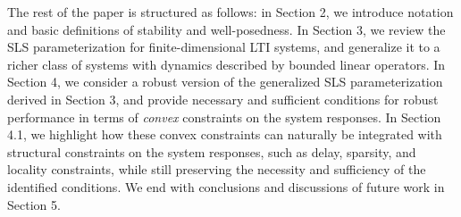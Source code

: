 The rest of the paper is structured as follows: in Section 2, we introduce notation and basic definitions of stability and well-posedness.  In Section 3, we review the SLS parameterization for finite-dimensional LTI systems, and generalize it to a richer class of systems with dynamics described by bounded linear operators.  In Section 4, we consider a robust version of the generalized SLS parameterization derived in Section 3, and provide necessary and sufficient conditions for robust performance in terms of \emph{convex} constraints on the system responses.  In Section 4.1, we highlight how these convex constraints can naturally be integrated with structural constraints on the system responses, such as delay, sparsity, and locality constraints, while still preserving the necessity and sufficiency of the identified conditions.  We end with conclusions and discussions of future work in Section 5.